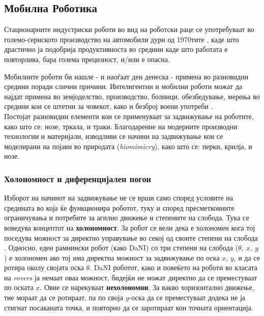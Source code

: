 \documentclass[11pt]{article}
\begin{document}
  \subsection{Мобилна Роботика}
    Стационарните индустриски роботи во вид на роботски раце се употребуваат во големо-сериското производство на автомобили дури од 1970тите \cite{robothistory}, каде што драстично ја подобрија продуктивноста во средини каде што работата е повторлива, бара голема прецизност, и/или е опасна.

    \bigbreak
    Мобилните роботи би нашле - и наоѓаат ден денеска - примена во разновидни средини поради слични причини. Интелигентни и мобилни роботи можат да најдат примена во земјоделство, производство, болници, обезбедување, мерења во средини кои се штетни за човекот, како и безброј воени употреби \cite{robotics}.\\
    Постојат разновидни елементи кои се применуваат за задвижување на роботите, како што се: нозе, тркала, и траки. Благодарение на модерните производни технологии и материјали, изводливи се начини на задвижување кои се моделирани на појави во природата (\textit{biomimicry}), како што се: перки, крилја, и нозе.

    \subsubsection{Холономност и диференцијален погон}
      Изборот на начинот на задвижување не се врши само според условите на средината во која ќе функционира роботот, туку и според пресметковните ограничувања и потребите за агилно движење и степените на слобода. Тука се воведува концептот на \textbf{холономност}. За робот се вели дека е холономен кога тој поседува можност за директно управување во секој од своите степени на слобода \cite{differential_drive_robots}. Односно, еден рамнински робот (како DaNI) со три степени на слобода ($\theta,\ x,\ y$) е холономен ако тој има директна можност за задвижување по оска $x$, $y$, и да се ротира околу својата оска $\theta$. DaNI роботот, како и повеќето на роботи во класата на \textit{rovers} ја немаат оваа можност, бидејќи не можат директно да се преместуваат по оската $x$. Овие се нарекуваат \textbf{нехолономни}. За вакво хоризонтално движење, тие мораат да се ротираат, па по своја $y$-оска да се преместуваат додека не ја стигнат посаканата точка, и повторно да се заротираат кон точната ориентација.
\end{document}
